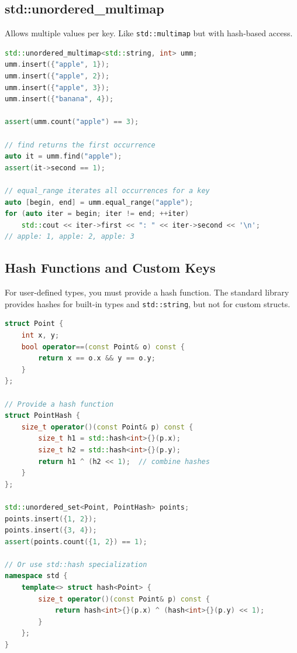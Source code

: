 \subsection{std::unordered\_multimap}

Allows multiple values per key. Like \texttt{std::multimap} but with hash-based access.

\begin{lstlisting}[language=C++]
std::unordered_multimap<std::string, int> umm;
umm.insert({"apple", 1});
umm.insert({"apple", 2});
umm.insert({"apple", 3});
umm.insert({"banana", 4});

assert(umm.count("apple") == 3);

// find returns the first occurrence
auto it = umm.find("apple");
assert(it->second == 1);

// equal_range iterates all occurrences for a key
auto [begin, end] = umm.equal_range("apple");
for (auto iter = begin; iter != end; ++iter)
    std::cout << iter->first << ": " << iter->second << '\n';
// apple: 1, apple: 2, apple: 3
\end{lstlisting}

\subsection{Hash Functions and Custom Keys}

For user-defined types, you must provide a hash function. The standard library provides hashes for built-in types and \texttt{std::string}, but not for custom structs.

\begin{lstlisting}[language=C++]
struct Point {
    int x, y;
    bool operator==(const Point& o) const {
        return x == o.x && y == o.y;
    }
};

// Provide a hash function
struct PointHash {
    size_t operator()(const Point& p) const {
        size_t h1 = std::hash<int>{}(p.x);
        size_t h2 = std::hash<int>{}(p.y);
        return h1 ^ (h2 << 1);  // combine hashes
    }
};

std::unordered_set<Point, PointHash> points;
points.insert({1, 2});
points.insert({3, 4});
assert(points.count({1, 2}) == 1);

// Or use std::hash specialization
namespace std {
    template<> struct hash<Point> {
        size_t operator()(const Point& p) const {
            return hash<int>{}(p.x) ^ (hash<int>{}(p.y) << 1);
        }
    };
}
\end{lstlisting}

